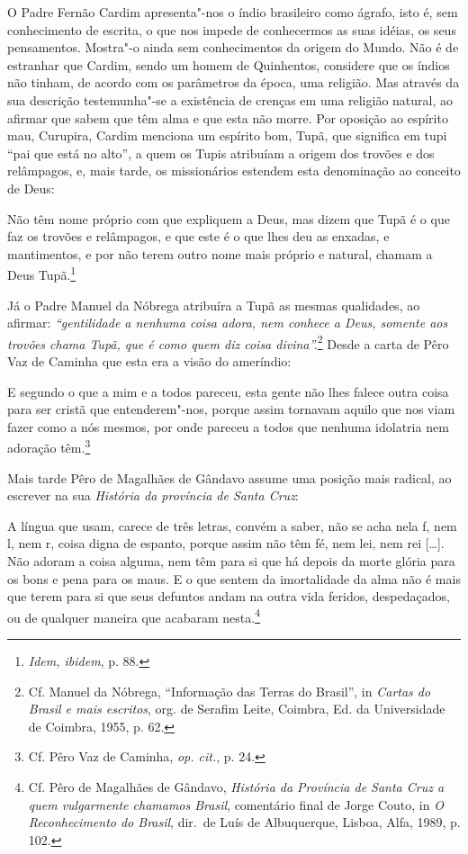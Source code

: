 O Padre Fernão Cardim apresenta"-nos o índio brasileiro como ágrafo,
isto é, sem conhecimento de escrita, o que nos impede de conhecermos as
suas idéias, os seus pensamentos. Mostra"-o ainda sem conhecimentos da
origem do Mundo. Não é de estranhar que Cardim, sendo um homem de
Quinhentos, considere que os índios não tinham, de acordo com os parâmetros
da época, uma religião. Mas através da sua descrição testemunha"-se a
existência de crenças em uma religião natural, ao afirmar que sabem que
têm alma e que esta não morre. Por oposição ao espírito mau,
Curupira, Cardim menciona um espírito bom, Tupã, que
significa em tupi ``pai que está no alto'', a quem os Tupis atribuíam a
origem dos trovões e dos relâmpagos, e, mais tarde, os missionários
estendem esta denominação ao conceito de Deus:

\begin{hedraquote}
Não têm nome próprio com que expliquem a Deus, mas dizem que
Tupã é o que faz os trovões e relâmpagos, e que este é o que lhes deu
as enxadas, e mantimentos, e por não terem outro nome mais próprio e
natural, chamam a Deus Tupã.\footnote{ \textit{Idem, ibidem}, p. 88.} 
\end{hedraquote}

Já o Padre Manuel da Nóbrega atribuíra a Tupã as mesmas qualidades,
ao afirmar: \textit{``gentilidade a nenhuma coisa adora, nem
conhece a Deus, somente aos trovões chama Tupã, que é como quem diz
coisa divina''.}\footnote{ Cf. Manuel da Nóbrega, ``Informação das
Terras do Brasil'', in \textit{Cartas do Brasil e mais escritos}, org.
de Serafim Leite, Coimbra, Ed. da Universidade de Coimbra, 1955, p.
62.} Desde a carta de Pêro Vaz de Caminha que esta era a
visão do ameríndio:

\begin{hedraquote}
E segundo o que a mim e a todos
pareceu, esta gente não lhes falece outra coisa para ser cristã que
entenderem"-nos, porque assim tornavam aquilo que nos viam fazer como a
nós mesmos, por onde pareceu a todos que nenhuma idolatria nem adoração
têm.\footnote{ Cf. Pêro Vaz de Caminha, \textit{op. cit.}, p. 24.}
\end{hedraquote}

Mais tarde Pêro de Magalhães de Gândavo assume uma posição mais radical,
ao escrever na sua \textit{História da província de Santa Cruz}:

\begin{hedraquote} 
[\ldots] A língua que usam, carece de três letras, convém
a saber, não se acha nela f, nem l, nem r, coisa digna de espanto, 
porque assim não têm fé, nem lei, nem rei [\ldots]. 
Não adoram a coisa alguma, nem têm para si que há depois da
morte glória para os bons e pena para os maus. E o que sentem da
imortalidade da alma não é mais que terem para si que seus defuntos
andam na outra vida feridos, despedaçados, ou de qualquer maneira que
acabaram nesta.\footnote{ Cf. Pêro de Magalhães de Gândavo,
\textit{História da Província de Santa Cruz a quem vulgarmente chamamos
Brasil}, comentário final de Jorge Couto, in \textit{O Reconhecimento do Brasil}, 
dir.~de Luís de Albuquerque, Lisboa, Alfa, 1989, p. 102.} 
\end{hedraquote}

